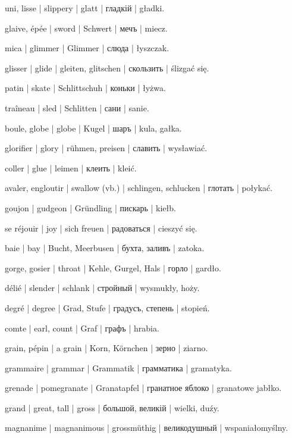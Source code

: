 \begin{outdent}{1em}
uni, lisse | slippery | glatt | гладкій | gładki.

glaive, épée | sword | Schwert | мечъ | miecz.

mica | glimmer | Glimmer | слюда | łyszczak.

glisser | glide | gleiten, glitschen | скользить | ślizgać
się.

\uvsubentry{}
patin | skate | Schlittschuh | коньки | łyżwa.


\uvsubentry{}
traîneau | sled | Schlitten | сани | sanie.

boule, globe | globe | Kugel | шаръ | kula, gałka.

glorifier | glory | rühmen, preisen | славить | wysławiać.

coller | glue | leimen | клеить | kleić.

avaler, engloutir | swallow (vb.) | schlingen, schlucken | глотать | połykać.

goujon | gudgeon | Gründling | пискарь | kiełb.

se réjouir | joy | sich freuen | радоваться | cieszyć się.

baie | bay | Bucht, Meerbusen | бухта, заливъ | zatoka.

gorge, gosier | throat | Kehle, Gurgel, Hals | горло | gardło.

délié | slender | schlank | стройный | wysmukły, hoży.

degré | degree | Grad, Stufe | градусъ, степень | stopień.

comte | earl, count | Graf | графъ | hrabia.

grain, pépin | a grain | Korn, Körnchen | зерно | ziarno.

grammaire | grammar | Grammatik | грамматика | gramatyka.

grenade | pomegranate | Granatapfel | гранатное яблоко | granatowe jabłko.

grand | great, tall | gross | большой, великій | wielki,
duźy.

\uvsubentry{}
magnanime | magnanimous | grossmüthig | великодушный | wspaniałomyślny.


\end{outdent}
